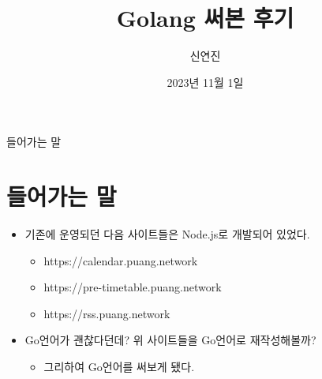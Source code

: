 \documentclass{beamer}
\title{Golang 써본 후기}
\author{신연진}
\date{2023년 11월 1일}
\begin{document}
 \begin{frame}
    \maketitle
 \end{frame}

 \begin{frame}
  \tableofcontents
 \end{frame}

 \begin{frame}{들어가는 말}
    \section{들어가는 말}
    \begin{itemize}
     \item 기존에 운영되던 다음 사이트들은 Node.js로 개발되어 있었다.

     \begin{itemize}
      \item https://calendar.puang.network
      \item https://pre-timetable.puang.network
      \item https://rss.puang.network
     \end{itemize}

     \item Go언어가 괜찮다던데? 위 사이트들을 Go언어로 재작성해볼까?

    \begin{itemize}
      \item 그리하여 Go언어를 써보게 됐다.
     \end{itemize}
    \end{itemize}
 \end{frame}
\end{document}
